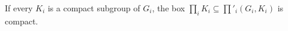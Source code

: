 If every $K_i$ is a compact subgroup of $G_i$, the box $\prod_iK_i\subseteq\prod'_i(G_i,K_i)$ is compact.
